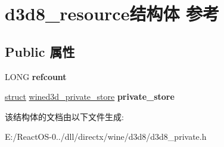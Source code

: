\hypertarget{structd3d8__resource}{}\section{d3d8\+\_\+resource结构体 参考}
\label{structd3d8__resource}
\subsection*{Public 属性}
\begin{DoxyCompactItemize}
\item 
\mbox{\label{structd3d8__resource_ac75e082c45acdb5767e1ddc79cb23d39}} 
L\+O\+NG {\bfseries refcount}
\item 
\mbox{\label{structd3d8__resource_a1e6c9c56ac7816766c93782c296343df}} 
\hyperlink{interfacestruct}{struct} \hyperlink{structwined3d__private__store}{wined3d\+\_\+private\+\_\+store} {\bfseries private\+\_\+store}
\end{DoxyCompactItemize}


该结构体的文档由以下文件生成\+:\begin{DoxyCompactItemize}
\item 
E\+:/\+React\+O\+S-\/0../dll/directx/wine/d3d8/d3d8\+\_\+private.\+h\end{DoxyCompactItemize}
